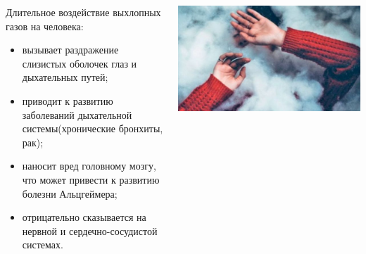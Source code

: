 \begin{frame}{\insertsectionhead}
    \begin{columns}[onlytextwidth]
        \begin{column}{.50\linewidth}
          \footnotesize
          Длительное воздействие выхлопных газов на человека:
          \begin{itemize}
              \item вызывает раздражение слизистых оболочек глаз и дыхательных путей;
              \item приводит к развитию заболеваний дыхательной системы(хронические бронхиты, рак);
              \item наносит вред головному мозгу, что может привести к развитию болезни Альцгеймера;
              \item отрицательно сказывается на нервной и сердечно-сосудистой системах.
          \end{itemize}            
        \end{column}
      
        \begin{column}{.47\linewidth}
          \includegraphics[width=1.1\textwidth]{assets/chelovek-umeraet-ot-vihlopa.jpg}
        \end{column}
      
      \end{columns}
\end{frame}